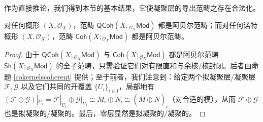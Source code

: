 作为直接推论，我们得到本节的基本结果，它使凝聚层的导出范畴之存在合法化。

\begin{Cor}\label{QCohisabelian}
对任何概形 $(X,\mathcal{O}_X)$，范畴 $\mathsf{QCoh}(X;{}_{\mathcal{O}_X}\!\mathsf{Mod})$ 都是阿贝尔范畴；而对任何诺特概形 $(X,\mathcal{O}_X)$，范畴 $\mathsf{Coh}(X;{}_{\mathcal{O}_X}\!\mathsf{Mod})$ 都是阿贝尔范畴。
\end{Cor}

\begin{proof}
由于 $\mathsf{QCoh}(X;{}_{\mathcal{O}_X}\!\mathsf{Mod})$ 与 $\mathsf{Coh}(X;{}_{\mathcal{O}_X}\!\mathsf{Mod})$ 都是阿贝尔范畴 $\mathsf{Sh}(X;{}_{\mathcal{O}_X}\!\mathsf{Mod})$ 的全子范畴，只需验证它们对有限直和与余核/核封闭。后者由命题 \ref{cokernelscoherent} 提供；至于前者，我们注意到：给定两个拟凝聚层/凝聚层 $\mathcal{F}, \mathcal{G}$ 以及它们共同的开覆盖 $\{U_i\}_{i\in I}$，局部地有 $(\mathcal{F}\oplus\mathcal{G})|_{U_i}=\mathcal{F}|_{U_i}\oplus\mathcal{G}|_{U_i}\cong \widetilde{M}_i\oplus\widetilde{N}_i\cong(\widetilde{M\oplus N})_i$（对合适的模），从而 $\mathcal{F}\oplus\mathcal{G}$ 也是拟凝聚的/凝聚的。最后，零层显然是拟凝聚的/凝聚的。
\end{proof}

